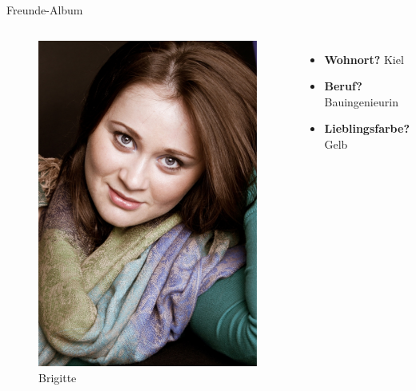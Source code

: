 \documentclass[aspectratio=169,compress]{beamer}
\begin{document}
\begin{frame}{Freunde-Album}
	\begin{columns}[c]
		\begin{figure}
			\includegraphics[scale=.135]{brigitte_steckbrief}
			\caption{Brigitte}
		\end{figure}
		 \pause
		\begin{itemize}
			\item \textbf{Wohnort?} Kiel \pause
			\item \textbf{Beruf?} Bauingenieurin \pause
			\item \textbf{Lieblingsfarbe?} Gelb
		\end{itemize}
	\end{columns}
\end{frame}
\end{document}
